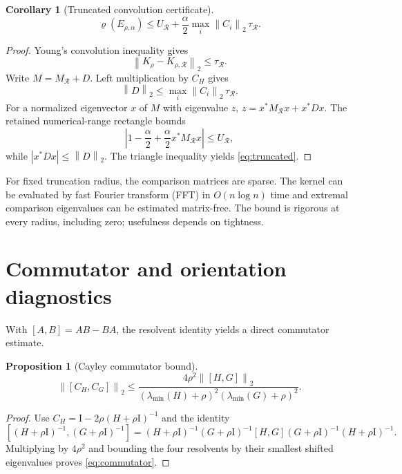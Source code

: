 \documentclass[11pt]{article}
\newtheorem{corollary}[theorem]{Corollary}
\newtheorem{proposition}[theorem]{Proposition}
\newcommand{\norm}[1]{\left\lVert #1\right\rVert}
\newcommand{\spr}{\varrho}
\newcommand{\Id}{\mathrm{I}}
\begin{document}
\begin{corollary}[Truncated convolution certificate]\label{cor:truncated}
\begin{equation}
\spr(E_{\rho,\alpha})
\le U_{\mathcal R}
+\frac{\alpha}{2}\max_i\norm{C_i}_2\,\tau_{\mathcal R}.
\label{eq:truncated}
\end{equation}
\end{corollary}
\begin{proof}
Young's convolution inequality gives
\[
\norm{K_\rho-K_{\rho,\mathcal R}}_2\le\tau_{\mathcal R}.
\]
Write $M=M_{\mathcal R}+D$. Left multiplication by $C_H$ gives
\[
\norm D_2\le\max_i\norm{C_i}_2\,\tau_{\mathcal R}.
\]
For a normalized eigenvector $x$ of $M$ with eigenvalue $z$,
$z=x^*M_{\mathcal R}x+x^*Dx$. The retained numerical-range rectangle bounds
\[
\left|1-\frac{\alpha}{2}
+\frac{\alpha}{2}x^*M_{\mathcal R}x\right|
\le U_{\mathcal R},
\]
while $|x^*Dx|\le\norm D_2$. The triangle inequality yields
\eqref{eq:truncated}.
\end{proof}
For fixed truncation radius, the comparison matrices are sparse. The kernel
can be evaluated by fast Fourier transform (FFT) in $O(n\log n)$ time and extremal comparison
eigenvalues can be estimated matrix-free. The bound is rigorous at every
radius, including zero; usefulness depends on tightness.

\section{Commutator and orientation diagnostics}\label{sec:commutator}
With $[A,B]=AB-BA$, the resolvent identity yields a direct commutator estimate.
\begin{proposition}[Cayley commutator bound]
\begin{equation}
\norm{[C_H,C_G]}_2
\le
\frac{4\rho^2\norm{[H,G]}_2}
{(\lambda_{\min}(H)+\rho)^2
(\lambda_{\min}(G)+\rho)^2}.
\label{eq:commutator}
\end{equation}
\end{proposition}
\begin{proof}
Use
$C_H=\Id-2\rho(H+\rho\Id)^{-1}$ and the identity
\[
[(H+\rho\Id)^{-1},(G+\rho\Id)^{-1}]
=(H+\rho\Id)^{-1}(G+\rho\Id)^{-1}
[H,G](G+\rho\Id)^{-1}(H+\rho\Id)^{-1}.
\]
Multiplying by $4\rho^2$ and bounding the four resolvents by their smallest
shifted eigenvalues proves \eqref{eq:commutator}.
\end{proof}
\end{document}
